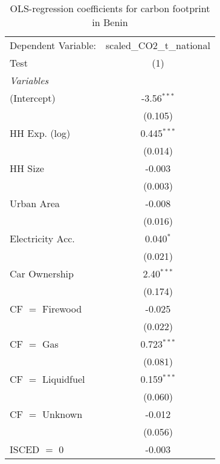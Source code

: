 
\begin{table}[htbp!]
   \centering
   \small
   \begin{adjustbox}{width = 1\textwidth, max height = 0.95\textheight, center}
      \begin{threeparttable}[b]
         \caption{\label{tab:OLS_2_BEN} OLS-regression coefficients for carbon footprint in Benin}
         \begin{tabular}{lc}
            \tabularnewline \midrule \midrule
            Dependent Variable: & scaled\_CO2\_t\_national\\     
            Test                & (1)\\  
            \midrule
            \emph{Variables}\\
            (Intercept)         & -3.56$^{***}$\\   
                                & (0.105)\\   
            HH Exp. (log)       & 0.445$^{***}$\\   
                                & (0.014)\\   
            HH Size             & -0.003\\   
                                & (0.003)\\   
            Urban Area          & -0.008\\   
                                & (0.016)\\   
            Electricity Acc.    & 0.040$^{*}$\\   
                                & (0.021)\\   
            Car Ownership       & 2.40$^{***}$\\   
                                & (0.174)\\   
            CF $=$ Firewood     & -0.025\\   
                                & (0.022)\\   
            CF $=$ Gas          & 0.723$^{***}$\\   
                                & (0.081)\\   
            CF $=$ Liquidfuel   & 0.159$^{***}$\\   
                                & (0.060)\\   
            CF $=$ Unknown      & -0.012\\   
                                & (0.056)\\   
            ISCED $=$ 0         & -0.003\\   

\end{tabular}
\end{threeparttable}
\end{adjustbox}
\end{table}
